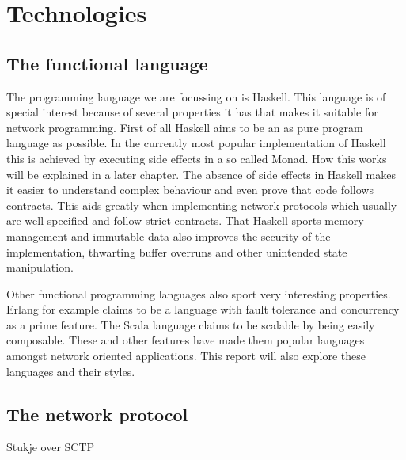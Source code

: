 \chapter{Technologies}
\section{The functional language}
The programming language we are focussing on is Haskell. This language is of special interest because of several properties it has that makes it suitable for network programming. First of all Haskell aims to be an as pure program language as possible. In the currently most popular implementation of Haskell this is achieved by executing side effects in a so called Monad. How this works will be explained in a later chapter. The absence of side effects in Haskell makes it easier to understand complex behaviour and even prove that code follows contracts. This aids greatly when implementing network protocols which usually are well specified and follow strict contracts. That Haskell sports memory management and immutable data also improves the security of the implementation, thwarting buffer overruns and other unintended state manipulation.

Other functional programming languages also sport very interesting properties. Erlang for example claims to be a language with fault tolerance and concurrency as a prime feature\cite{armstrong_concurrent_1993}. The Scala language claims to be scalable by being easily composable\cite{odersky_overview_????}. These and other features have made them popular languages amongst network oriented applications. This report will also explore these languages and their styles.
\section{The network protocol}
Stukje over SCTP

